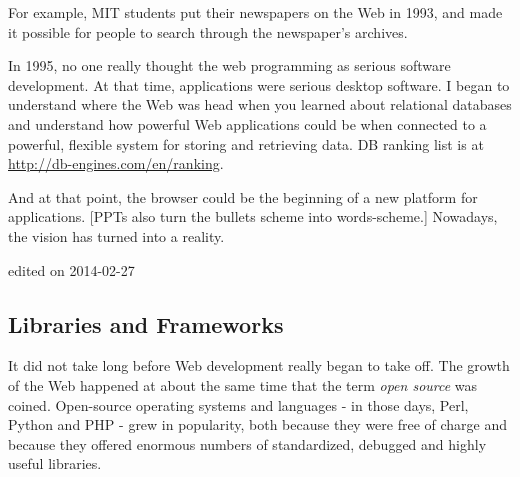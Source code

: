 For example, MIT students put their newspapers on the Web in 1993,
and made it possible for people to search through the newspaper's archives.

In 1995, no one really thought the web programming as serious software development.
At that time, applications were serious desktop software. 
I began to understand where the Web was head when you learned about relational databases
and understand how powerful Web applications could be when connected to a powerful,
flexible system for storing and retrieving data.
DB ranking list is at \url{http://db-engines.com/en/ranking}.

And at that point, the browser could be the beginning of a new platform for applications.
[PPTs also turn the bullets scheme into words-scheme.]
Nowadays, the vision has turned into a reality.
\par\hfill {\tiny edited on 2014-02-27}

\subsection{Libraries and Frameworks}
It did not take long before Web development really began to take off.
The growth of the Web happened at about the same time that the term {\it open source} was coined.
Open-source operating systems and languages - in those days,
Perl, Python and PHP - grew in popularity, both because they were free of charge
and because they offered enormous numbers of standardized, debugged and highly useful
libraries.


